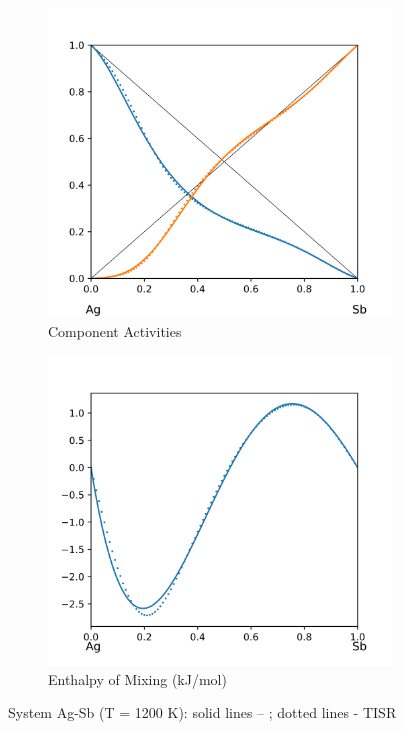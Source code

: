 \documentclass[12pt,abstract]{scrartcl}
\begin{document}
\begin{figure}
\centering
\begin{subfigure}{.5\textwidth}
  \centering
  \includegraphics[width=1\linewidth]{Ag-Sb_Activity}
  \caption{Component Activities}
  \label{fig:sub1}
\end{subfigure}%
\begin{subfigure}{.5\textwidth}
  \centering
  \includegraphics[width=1\linewidth]{Ag-Sb_Enthalpy}
  \caption{Enthalpy of Mixing (kJ/mol)}
  \label{fig:sub2}
\end{subfigure}
\caption{System Ag-Sb (T = 1200 K): solid lines -- \cite{Ag-In_Data}; dotted lines - TISR}
\label{fig:Ag-Sb}
\end{figure}
\end{document}

